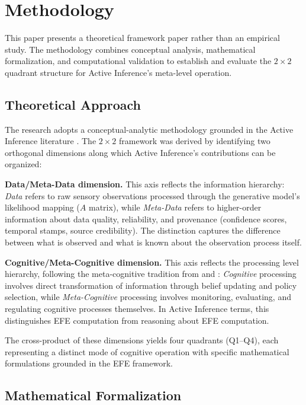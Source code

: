 \documentclass[
]{article}
\begin{document}
\newpage

\section{Methodology}\label{sec:methodology}

This paper presents a theoretical framework paper rather than an
empirical study. The methodology combines conceptual analysis,
mathematical formalization, and computational validation to establish
and evaluate the \(2 \times 2\) quadrant structure for Active
Inference's meta-level operation.

\subsection{Theoretical Approach}\label{theoretical-approach}

The research adopts a conceptual-analytic methodology grounded in the
Active Inference literature \cite{friston2010free, parr2022active}. The
\(2 \times 2\) framework was derived by identifying two orthogonal
dimensions along which Active Inference's contributions can be
organized:

\textbf{Data/Meta-Data dimension.} This axis reflects the information
hierarchy: \emph{Data} refers to raw sensory observations processed
through the generative model's likelihood mapping (\(A\) matrix), while
\emph{Meta-Data} refers to higher-order information about data quality,
reliability, and provenance (confidence scores, temporal stamps, source
credibility). The distinction captures the difference between what is
observed and what is known about the observation process itself.

\textbf{Cognitive/Meta-Cognitive dimension.} This axis reflects the
processing level hierarchy, following the meta-cognitive tradition from
\cite{flavell1979metacognition} and \cite{nelson1990metamemory}:
\emph{Cognitive} processing involves direct transformation of
information through belief updating and policy selection, while
\emph{Meta-Cognitive} processing involves monitoring, evaluating, and
regulating cognitive processes themselves. In Active Inference terms,
this distinguishes EFE computation from reasoning about EFE computation.

The cross-product of these dimensions yields four quadrants (Q1--Q4),
each representing a distinct mode of cognitive operation with specific
mathematical formulations grounded in the EFE framework.

\subsection{Mathematical
Formalization}\label{mathematical-formalization}
\end{document}
